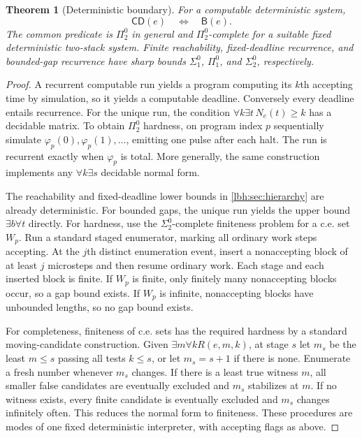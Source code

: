 \documentclass[11pt,letterpaper]{article}
\newtheorem{theorem}{Theorem}[section]
\theoremstyle{definition}
\theoremstyle{remark}
\newcommand{\sig}[1]{\Sigma^{0}_{#1}}
\newcommand{\ppi}[1]{\Pi^{0}_{#1}}
\newcommand{\Buchi}{\mathsf{B}}
\newcommand{\Clock}{\mathsf{CD}}
\newcommand{\1}{\mathbf 1}
\begin{document}
\begin{theorem}[Deterministic boundary]\label{lbh:thm:deterministic}\label{lbh:qd:prop:det}
For a computable deterministic system,
\[
 \Clock(e)\quad\Longleftrightarrow\quad\Buchi(e).
\]
The common predicate is $\ppi2$ in general and $\ppi2$-complete for a
suitable fixed deterministic two-stack system. Finite reachability,
fixed-deadline recurrence, and bounded-gap recurrence have sharp bounds
$\sig1$, $\ppi1$, and $\sig2$, respectively.
\end{theorem}
\begin{proof}
A recurrent computable run yields a program computing its $k$th accepting
time by simulation, so it yields a computable deadline. Conversely every
deadline entails recurrence. For the unique run, the condition
$\forall k\exists t\,N_e(t)\ge k$ has a decidable matrix. To obtain
$\ppi2$ hardness, on program index $p$ sequentially simulate
$\varphi_p(0),\varphi_p(1),\ldots$, emitting one pulse after each halt.
The run is recurrent exactly when $\varphi_p$ is total. More generally,
the same construction implements any $\forall k\exists s$ decidable
normal form.

The reachability and fixed-deadline lower bounds in
\cref{lbh:sec:hierarchy} are already deterministic. For bounded gaps, the
unique run yields the upper bound $\exists b\forall t$ directly.
For hardness, use the $\sig2$-complete finiteness problem for a c.e. set
$W_p$. Run a standard staged enumerator, marking all ordinary work steps
accepting. At the $j$th distinct enumeration event, insert a nonaccepting
block of at least $j$ microsteps and then resume ordinary work. Each stage
and each inserted block is finite. If $W_p$ is finite, only finitely many
nonaccepting blocks occur, so a gap bound exists. If $W_p$ is infinite,
nonaccepting blocks have unbounded lengths, so no gap bound exists.

For completeness, finiteness of c.e. sets has the required hardness by a
standard moving-candidate construction. Given
$\exists m\forall k R(e,m,k)$, at stage $s$ let $m_s$ be the least
$m\le s$ passing all tests $k\le s$, or let $m_s=s+1$ if there is none.
Enumerate a fresh number whenever $m_s$ changes. If there is a least true
witness $m$, all smaller false candidates are eventually excluded and
$m_s$ stabilizes at $m$. If no witness exists, every finite candidate is
eventually excluded and $m_s$ changes infinitely often. This reduces the
normal form to finiteness. These procedures are modes of one fixed
deterministic interpreter, with accepting flags as above.
\end{proof}
\end{document}
